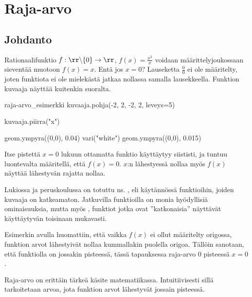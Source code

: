 \chapter{Raja-arvo}

\section{Johdanto}

Rationaalifunktio $f: \rr \backslash \{0 \} \to \rr$, $f(x) = \frac{x^2}{x}$ voidaan määrittelyjoukossaan sieventää muotoon $f(x) = x$. Entä jos $x = 0$? Lauseketta $\frac{0}{0}$ ei ole määritelty, joten funktiota ei ole mielekästä jatkaa nollassa samalla lausekkeella. Funktion kuvaaja näyttää kuitenkin suoralta.

\begin{luoKuva}{raja-arvo_esimerkki}
	kuvaaja.pohja(-2, 2, -2, 2, leveys=5)

	kuvaaja.piirra("x")
	
	geom.ympyra((0,0), 0.04)
	vari("white")
	geom.ympyra((0,0), 0.015)	
\end{luoKuva}

\begin{center}
\end{center}

Itse pistettä $x = 0$ lukuun ottamatta funktio käyttäytyy siististi, ja tuntuu luontevalta määritellä, että $f(x) = 0$. $x$:n lähestyessä nollaa myös $f(x)$ näyttää lähestyvän rajatta nollaa.

Lukiossa ja peruskoulussa on totuttu ns. , eli käytännössä funktioihin, joiden kuvaaja on katkeamaton. Jatkuvilla funktioilla on monia hyödyllisiä ominaisuuksia, mutta myös , funktiot jotka ovat ''katkonaisia'' näyttävät käyttäytyvän toisinaan mukavasti.

Esimerkin avulla huomattiin, että vaikka $f(x)$ ei ollut määritelty origossa, funktion arvot lähestyivät nollaa kummallakin puolella origoa. Tällöin sanotaan, että funktiolla on  jossakin pisteessä, tässä tapauksessa raja-arvo $0$ pisteessä $x=0$.

Raja-arvo on erittäin tärkeä käsite matematiikassa. Intuitiivisesti sillä tarkoitetaan arvoa, jota funktion arvot lähestyvät jossain pisteessä. %

